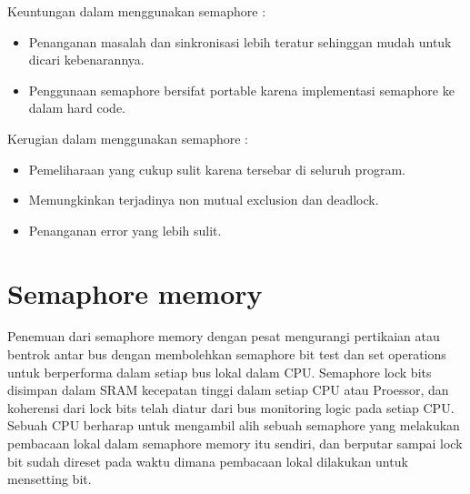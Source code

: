 Keuntungan dalam menggunakan semaphore :

\begin{itemize}
	\item Penanganan masalah dan sinkronisasi lebih teratur sehinggan mudah untuk dicari kebenarannya.
	\item Penggunaan semaphore bersifat portable karena implementasi semaphore ke dalam hard code.
\end{itemize}
	
	Kerugian dalam menggunakan semaphore :
	
	\begin{itemize}
		\item Pemeliharaan yang cukup sulit karena tersebar di seluruh program.
		\item Memungkinkan terjadinya non  mutual exclusion dan deadlock.
		\item Penanganan error yang lebih sulit.
	\end{itemize}
\section{Semaphore memory}
\cite{earnshaw1991semaphore}Penemuan dari semaphore memory dengan pesat mengurangi pertikaian atau bentrok antar bus dengan membolehkan semaphore bit test dan set operations untuk berperforma dalam setiap bus lokal dalam CPU. Semaphore lock bits disimpan dalam SRAM kecepatan tinggi dalam setiap CPU atau Proessor, dan koherensi dari 
lock bits telah diatur dari bus monitoring logic pada setiap CPU. Sebuah CPU berharap untuk mengambil alih sebuah semaphore yang melakukan pembacaan lokal dalam semaphore memory itu sendiri, dan berputar sampai lock bit sudah direset pada waktu dimana pembacaan lokal dilakukan untuk mensetting bit.